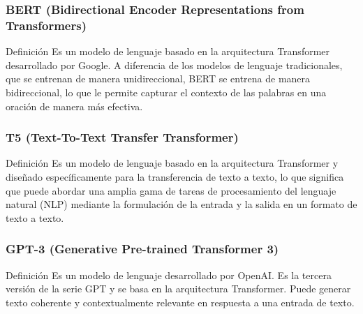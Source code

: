 \documentclass[
11pt, %
%
aspectratio=169, %
]{beamer}
\begin{document}
	\begin{frame}
		\frametitle{BERT (Bidirectional Encoder Representations from Transformers)}
		
		\begin{block}{Definici\'on}
			Es un modelo de lenguaje basado en la arquitectura Transformer desarrollado por Google. A diferencia de los modelos de lenguaje tradicionales, que se entrenan de manera unidireccional, BERT se entrena de manera bidireccional, lo que le permite capturar el contexto de las palabras en una oración de manera más efectiva.
		\end{block}
		
		
	\end{frame}
	
	
	\begin{frame}
		\frametitle{T5 (Text-To-Text Transfer Transformer)}
		\begin{block}{Definici\'on}
			Es un modelo de lenguaje basado en la arquitectura Transformer y diseñado específicamente para la transferencia de texto a texto, lo que significa que puede abordar una amplia gama de tareas de procesamiento del lenguaje natural (NLP) mediante la formulación de la entrada y la salida en un formato de texto a texto.
		\end{block}
	
	\end{frame}
	\begin{frame}
		\frametitle{GPT-3 (Generative Pre-trained Transformer 3)}
		
		\begin{block}{Definici\'on}
			Es un modelo de lenguaje desarrollado por OpenAI. Es la tercera versión de la serie GPT y se basa en la arquitectura Transformer. Puede generar texto coherente y contextualmente relevante en respuesta a una entrada de texto.
		\end{block}
		
		
	\end{frame}
\end{document}
